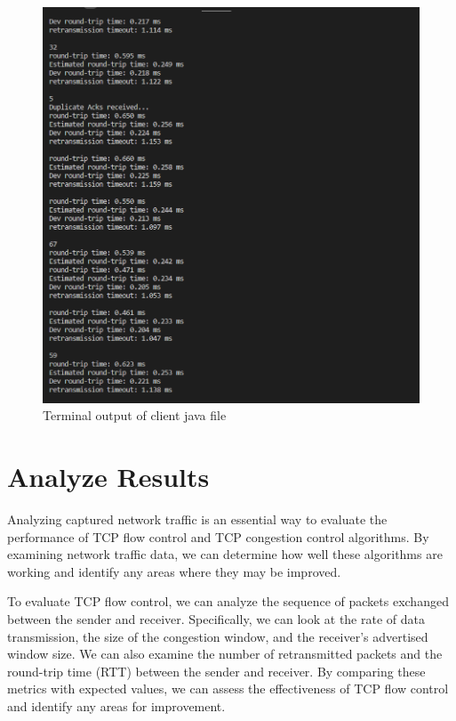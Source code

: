 \documentclass[11pt]{article}
\begin{document}
  \begin{figure}[!h]
\centering
\includegraphics[width=\textwidth]{c_client2.png}
\caption{Terminal output of client java file }
\end{figure}
\FloatBarrier


\section{Analyze Results}

Analyzing captured network traffic is an essential way to evaluate the performance of TCP flow control and TCP congestion control algorithms. By examining network traffic data, we can determine how well these algorithms are working and identify any areas where they may be improved.

To evaluate TCP flow control, we can analyze the sequence of packets exchanged between the sender and receiver. Specifically, we can look at the rate of data transmission, the size of the congestion window, and the receiver's advertised window size. We can also examine the number of retransmitted packets and the round-trip time (RTT) between the sender and receiver. By comparing these metrics with expected values, we can assess the effectiveness of TCP flow control and identify any areas for improvement.
\end{document}
